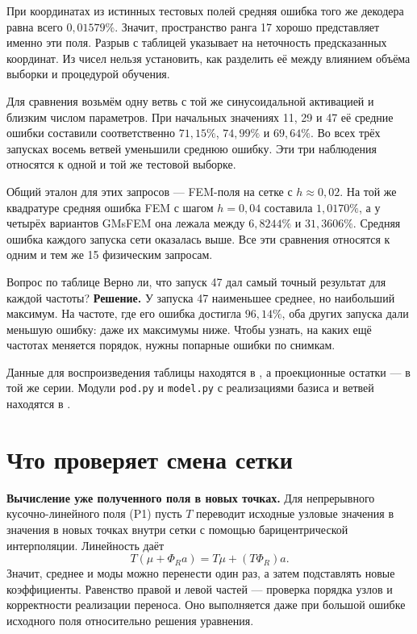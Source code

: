 При координатах из истинных тестовых полей средняя ошибка того же
декодера равна всего $0{,}01579\%$. Значит, пространство ранга 17
хорошо представляет именно эти поля. Разрыв с таблицей указывает на
неточность предсказанных координат. Из чисел нельзя установить, как
разделить её между влиянием объёма выборки и процедурой обучения.

Для сравнения возьмём одну ветвь с той же синусоидальной активацией
и близким числом параметров. При начальных значениях 11, 29 и 47
её средние ошибки составили соответственно $71{,}15\%$, $74{,}99\%$
и $69{,}64\%$. Во всех трёх запусках восемь ветвей уменьшили среднюю
ошибку. Эти три наблюдения относятся к одной и той же тестовой выборке.

Общий эталон для этих запросов --- FEM-поля на сетке с $h\approx0{,}02$.
На той же квадратуре средняя ошибка FEM с шагом $h=0{,}04$ составила
$1{,}0170\%$, а у четырёх вариантов GMsFEM она лежала между $6{,}8244\%$
и $31{,}3606\%$. Средняя ошибка каждого запуска сети оказалась выше.
Все эти сравнения относятся к одним и тем же 15 физическим запросам.

\begin{worked}{Вопрос по таблице}
Верно ли, что запуск 47 дал самый точный результат для каждой частоты?
\textbf{Решение.} У запуска 47 наименьшее среднее, но наибольший
максимум. На частоте, где его ошибка достигла $96{,}14\%$, оба других
запуска дали меньшую ошибку: даже их максимумы ниже. Чтобы узнать,
на каких ещё частотах меняется порядок, нужны попарные ошибки по снимкам.
\end{worked}

Данные для воспроизведения таблицы находятся в
, а проекционные
остатки --- в  той же серии.
Модули \texttt{pod.py} и \texttt{model.py} с реализациями базиса и ветвей
находятся в .

\clearpage
\section{Что проверяет смена сетки}
\label{adv:mesh}

\textbf{Вычисление уже полученного поля в новых точках.}
Для непрерывного кусочно-линейного поля (P1) пусть $T$ переводит
исходные узловые значения в значения в новых точках внутри сетки
с помощью барицентрической интерполяции. Линейность даёт
\[
 T(\mu+\Phi_R a)=T\mu+(T\Phi_R)a .
\]
Значит, среднее и моды можно перенести один раз, а затем подставлять
новые коэффициенты. Равенство правой и левой частей --- проверка порядка
узлов и корректности реализации переноса. Оно выполняется даже при
большой ошибке исходного поля относительно решения уравнения.

